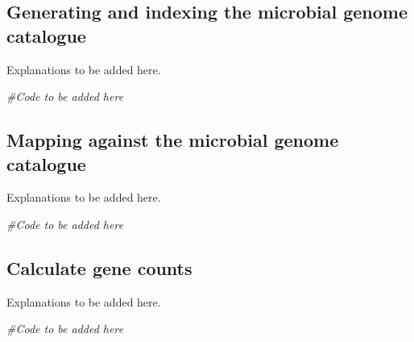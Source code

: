 \documentclass[
]{book}
\newenvironment{Shaded}{\begin{snugshade}}{\end{snugshade}}
\newcommand{\CommentTok}[1]{\textcolor[rgb]{0.56,0.35,0.01}{\textit{#1}}}
\begin{document}
\normalsize

\hypertarget{generating-and-indexing-the-microbial-genome-catalogue}{%
\subsection*{Generating and indexing the microbial genome catalogue}\label{generating-and-indexing-the-microbial-genome-catalogue}}

Explanations to be added here.

\small

\begin{Shaded}
\begin{Highlighting}[]
\CommentTok{\#Code to be added here}
\end{Highlighting}
\end{Shaded}

\normalsize

\hypertarget{mapping-against-the-microbial-genome-catalogue}{%
\subsection*{Mapping against the microbial genome catalogue}\label{mapping-against-the-microbial-genome-catalogue}}

Explanations to be added here.

\small

\begin{Shaded}
\begin{Highlighting}[]
\CommentTok{\#Code to be added here}
\end{Highlighting}
\end{Shaded}

\normalsize

\hypertarget{calculate-gene-counts}{%
\subsection*{Calculate gene counts}\label{calculate-gene-counts}}

Explanations to be added here.

\small

\begin{Shaded}
\begin{Highlighting}[]
\CommentTok{\#Code to be added here}
\end{Highlighting}
\end{Shaded}
\end{document}
